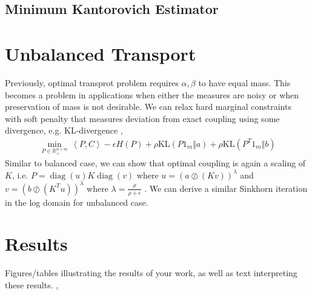 \documentclass{6838publ}
\newcommand\R{\ensuremath{\mathbb{R}}} %
\newcommand\inner[2]{\ensuremath{\left< #1, #2 \right>}} %
\DeclareMathOperator*{\diag}{diag} %
\begin{document}
\subsection{Minimum Kantorovich Estimator}

 

\section{Unbalanced Transport}

Previously, optimal transprot problem requires $\alpha,\beta$ to have equal mass. This becomes a problem in applications when either the measures are noisy or when preservation of mass is not desirable. We can relax hard marginal constraints with soft penalty that measures deviation from exact coupling using some divergence, e.g. KL-divergence \cite{chizatScalingAlgorithmsUnbalanced2017},
\begin{align}
    \min_{P\in\R^{n\times m}_+}\, 
        \inner{P}{C} - \epsilon H(P) + \rho \text{KL}(P1_m \Vert a) + \rho \text{KL}(P^T 1_m \Vert b)
\end{align}
Similar to balanced case, we can show that optimal coupling is again a scaling of $K$, i.e. $P = \diag(u) K \diag(v)$ where $u = (a \oslash (Kv))^{\lambda}$ and $v = (b \oslash (K^T u))^{\lambda}$ where $\lambda = \frac{\rho}{\rho + \epsilon}$ \cite{frognerLearningWassersteinLoss2015}. We can derive a similar Sinkhorn iteration in the log domain for unbalanced case.


\section{Results}

Figures/tables illustrating the results of your work, as well as text interpreting these results. \cite{peyreComputationalOptimalTransport2020},




\end{document}
